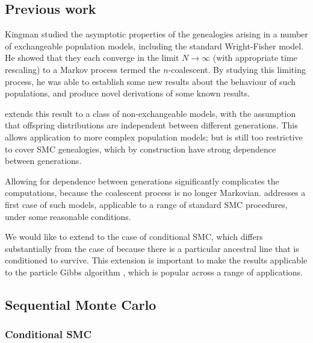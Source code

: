 \documentclass{article}
\begin{document}
\subsection{Previous work}
Kingman \citep{kingman1982gene, kingman1982coal, kingman1982exch} studied the asymptotic properties of the genealogies arising in a number of exchangeable population models, including the standard Wright-Fisher model. He showed that they each converge in the limit $N\to\infty$ (with appropriate time rescaling) to a Markov process termed the $n$-coalescent. By studying this limiting process, he was able to establish some new results about the behaviour of such populations, and produce novel derivations of some known results.

\citet{mohle1998} extends this result to a class of non-exchangeable models, with the assumption that offspring distributions are independent between different generations. This allows application to more complex population models; but is still too restrictive to cover SMC genealogies, which by construction have strong dependence between generations.

Allowing for dependence between generations significantly complicates the computations, because the coalescent process is no longer Markovian. \citet{koskela2018} addresses a first case of such models, applicable to a range of standard SMC procedures, under some reasonable conditions.

We would like to extend to the case of conditional SMC, which differs substantially from the case of \citet{koskela2018} because there is a particular ancestral line that is conditioned to survive. This extension is important to make the results applicable to the particle Gibbs algorithm \citep{andrieu2010}, which is popular across a range of applications.

\subsection{Sequential Monte Carlo}

\subsubsection{Conditional SMC}
\end{document}
